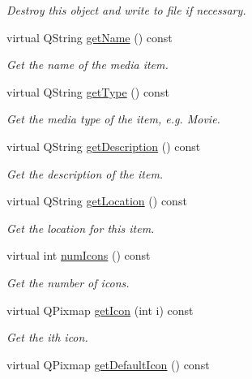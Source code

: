 \begin{DoxyCompactItemize}
\begin{DoxyCompactList}\small\item\em Destroy this object and write to file if necessary. \end{DoxyCompactList}\item 
virtual Q\-String \hyperlink{class_a_w_e_1_1_media_item_a8d01cc215610b3d7ab336d332fb472dd}{get\-Name} () const 
\begin{DoxyCompactList}\small\item\em Get the name of the media item. \end{DoxyCompactList}\item 
virtual Q\-String \hyperlink{class_a_w_e_1_1_media_item_a9a6399e22b02b753766109f7825878af}{get\-Type} () const 
\begin{DoxyCompactList}\small\item\em Get the media type of the item, e.\-g. Movie. \end{DoxyCompactList}\item 
virtual Q\-String \hyperlink{class_a_w_e_1_1_media_item_a80e3f5034aa628143b225c5a6fc8bec7}{get\-Description} () const 
\begin{DoxyCompactList}\small\item\em Get the description of the item. \end{DoxyCompactList}\item 
virtual Q\-String \hyperlink{class_a_w_e_1_1_media_item_adab45ebbb95cd03eeaffd9ac6ef54756}{get\-Location} () const 
\begin{DoxyCompactList}\small\item\em Get the location for this item. \end{DoxyCompactList}\item 
virtual int \hyperlink{class_a_w_e_1_1_media_item_a01258a17cdfa091b4a01521db3765fad}{num\-Icons} () const 
\begin{DoxyCompactList}\small\item\em Get the number of icons. \end{DoxyCompactList}\item 
virtual Q\-Pixmap \hyperlink{class_a_w_e_1_1_media_item_a3c02f1c2317244e104517bd68e486fa2}{get\-Icon} (int i) const 
\begin{DoxyCompactList}\small\item\em Get the {\ttfamily i}th icon. \end{DoxyCompactList}\item 
virtual Q\-Pixmap \hyperlink{class_a_w_e_1_1_media_item_a30a34c3024f2c0f8f89296ae1bc032f3}{get\-Default\-Icon} () const 

\end{DoxyCompactItemize}
